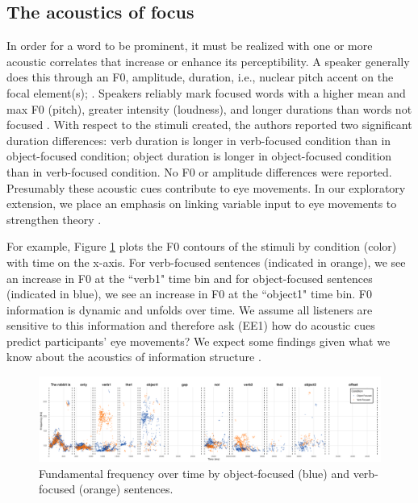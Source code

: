 \subsection{The acoustics of focus}
In order for a word to be prominent, it must be realized with one or more acoustic correlates that increase or enhance its perceptibility. A speaker generally does this through an F0, amplitude, duration, i.e., nuclear pitch accent on the focal element(s); \parencite{Gussenhoven1983}. Speakers reliably mark focused words with a higher mean and max F0 (pitch), greater intensity (loudness), and longer durations than words not focused \parencite{Breen2010}.
With respect to the stimuli \cite{ge2021a} created, the authors reported two significant duration differences: verb duration is longer in verb-focused condition than in object-focused condition; object duration is longer in object-focused condition than in verb-focused condition. No F0 or amplitude differences were reported. Presumably these acoustic cues contribute to eye movements. In our exploratory extension, we place an emphasis on linking variable input to eye movements to strengthen theory \parencite{magnuson2019fixations}. 

For example, Figure \ref{fig:acoustic} plots the F0 contours of the stimuli by condition (color) with time on the x-axis. For verb-focused sentences (indicated in orange), we see an increase in F0 at the ``verb1" time bin and for object-focused sentences (indicated in blue), we see an increase in F0 at the ``object1" time bin. F0 information is dynamic and unfolds over time. We assume all listeners are sensitive to this information and therefore ask (EE1) how do acoustic cues predict  participants' eye movements? We expect some findings given what we know about the acoustics of information structure \parencite{Breen2010}.

\begin{figure}[H]  %
    \centering
    \includegraphics[width=\textwidth,height=\textheight,keepaspectratio]{viz/accoustic.png}
    \caption{Fundamental frequency over time by object-focused (blue) and verb-focused (orange) sentences.}
    \label{fig:acoustic}
\end{figure}



